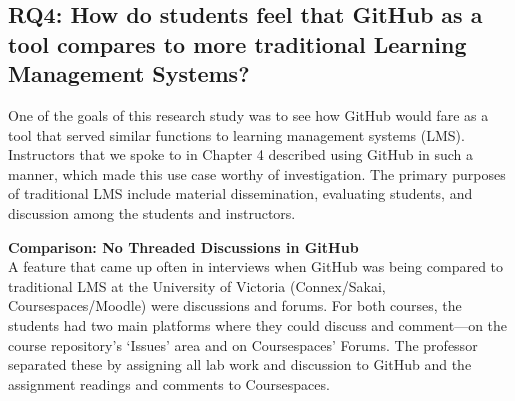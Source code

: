 



\subsection{RQ4: How do students feel that GitHub as a tool compares to more traditional Learning Management Systems?}
One of the goals of this research study was to see how GitHub would fare as a tool that served similar functions to learning management systems (LMS). Instructors that we spoke to in Chapter 4 described using GitHub in such a manner, which made this use case worthy of investigation. The primary purposes of traditional LMS include material dissemination, evaluating students, and discussion among the students and instructors.

\textbf{Comparison: No Threaded Discussions in GitHub} \\
A feature that came up often in interviews when GitHub was being compared to traditional LMS at the University of Victoria (Connex/Sakai, Coursespaces/Moodle) were discussions and forums. For both courses, the students had two main platforms where they could discuss and comment---on the course repository's `Issues' area and on Coursespaces' Forums. The professor separated these by assigning all lab work and discussion to GitHub and the assignment readings and comments to Coursespaces.

